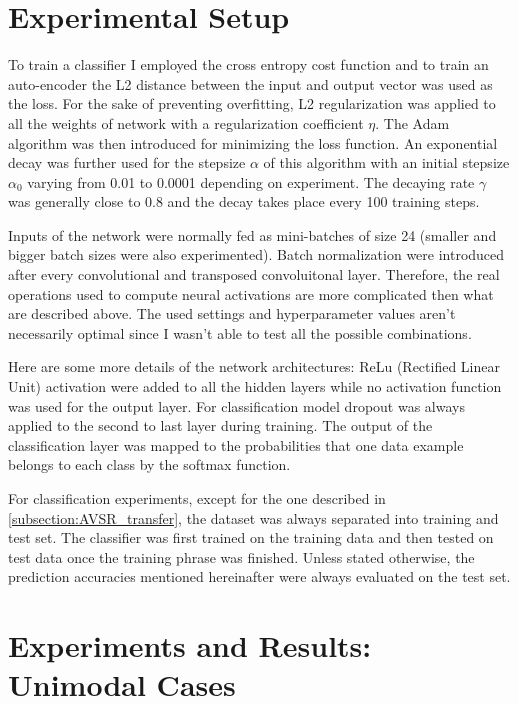 \section{Experimental Setup} \label{section:exp}

To train a classifier I employed the cross entropy cost function and to
train an auto-encoder the L2 distance between the input and output vector
was used as the loss. For the sake of preventing overfitting, L2
regularization \cite{Y. Bengio 2012} was applied to all the weights of
network with a regularization coefficient $\eta$.
The Adam algorithm \cite{D. Kingma 2014}
was then introduced for minimizing the loss function.
An exponential decay was further used for the stepsize $\alpha$ of this
algorithm with an initial stepsize $\alpha_0$ varying from 0.01 to 0.0001
depending on experiment. The decaying rate $\gamma$
was generally close to 0.8 and
the decay takes place every 100 training steps.

Inputs of the network were normally fed as mini-batches of size 24
(smaller and bigger batch sizes were also experimented).
Batch normalization \cite{S. Ioffe 2015} were introduced after every
convolutional and transposed convoluitonal layer. Therefore, the real
operations used to compute neural activations are more complicated
then what are described above. The used settings and hyperparameter
values aren't necessarily optimal since I wasn't able to test all the
possible combinations.

Here are some more details of the network architectures: ReLu
(Rectified Linear Unit) activation were added to all the hidden layers
\cite{A. Krizhevsky 2012} while no activation function was used for
the output layer.
For classification model dropout \cite{N. Srivastava 2014}
was always applied to the second to last layer during training.
The output of the classification layer was mapped to the probabilities
that one data example belongs to each class by the softmax function.

For classification experiments, except for the one described in
\ref{subsection:AVSR_transfer}, the dataset was always separated into
training and test set. The classifier was first trained on the training data
and then tested on test data once the training phrase was finished.
Unless stated otherwise, the prediction accuracies mentioned hereinafter
were always evaluated on the test set.

\section{Experiments and Results: Unimodal Cases} \label{section:uni}

